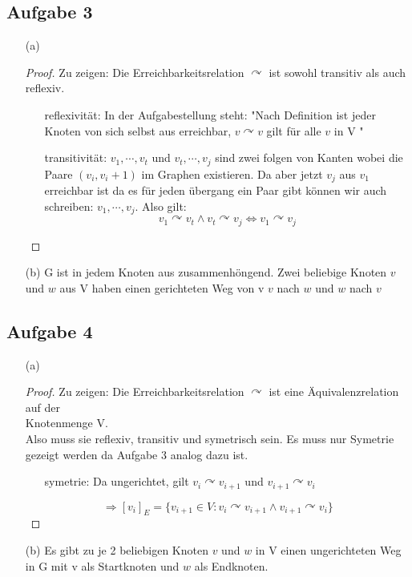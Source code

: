 \documentclass{article}
\begin{document}
\subsection*{Aufgabe 3}
\begin{itemize}
    \item [(a)] \begin{proof}
        Zu zeigen: Die Erreichbarkeitsrelation \(\curvearrowright\) ist sowohl transitiv als auch reflexiv.\\
        \begin{itemize}
            \item [reflexivität:] In der Aufgabestellung steht: "Nach Deﬁnition ist jeder Knoten von sich selbst aus erreichbar, \(v \curvearrowright v\) gilt für alle \(v\) in V "
            \item [transitivität:] \(v_1, \cdots, v_t\) und \(v_t, \cdots, v_j\) sind zwei folgen von Kanten wobei die Paare \((v_i, v_i+1)\) im Graphen existieren. Da aber jetzt \(v_j\) aus \(v_1\) erreichbar ist da es für jeden übergang ein Paar gibt können wir auch schreiben: \(v_1, \cdots, v_j\). Also gilt: 
            \[v_1 \curvearrowright v_t \wedge v_t \curvearrowright v_j \Leftrightarrow v_1 \curvearrowright v_j\] 
        \end{itemize}
    \end{proof}
    \item [(b)] G ist in jedem Knoten aus zusammenhöngend. Zwei beliebige Knoten \(v\) und \(w\) aus V haben einen gerichteten Weg von v
    \(v\) nach \(w\) und \(w\) nach \(v\)
\end{itemize}

\subsection*{Aufgabe 4}
    \begin{itemize}
        \item [(a)] \begin{proof}
            Zu zeigen: Die Erreichbarkeitsrelation \(\curvearrowright\) ist eine Äquivalenzrelation auf der \\Knotenmenge V. \\Also muss sie reflexiv, transitiv und symetrisch sein. Es muss nur Symetrie gezeigt werden da Aufgabe 3 analog dazu ist.
            \begin{itemize}
                \item [symetrie:] Da ungerichtet, gilt \(v_i \curvearrowright v_{i+1}\) und \(v_{i+1} \curvearrowright v_{i}\)
            \end{itemize}
            \[\Rightarrow [v_i]_E = \{v_{i+1} \in V : v_i \curvearrowright v_{i+1} \wedge v_{i+1} \curvearrowright v_{i} \}\]
        \end{proof}
        \item[(b)] Es gibt zu je 2 beliebigen Knoten \(v\) und \(w\) in V einen ungerichteten Weg in G mit v als Startknoten und \(w\) als Endknoten.
    \end{itemize}
\end{document}
